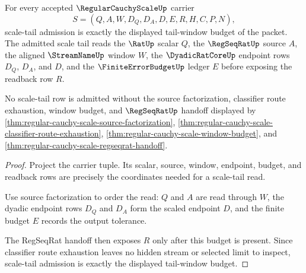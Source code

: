 \begin{theorem}
\label{thm:regular-cauchy-scale-tail-window-carrier-obligation}
For every accepted $\RegularCauchyScaleUp$ carrier
$$
S=(Q,A,W,D_Q,D_A,D,E,R,H,C,P,N),
$$
scale-tail admission is exactly the displayed tail-window budget of the packet. The admitted scale tail reads the $\RatUp$ scalar $Q$, the $\RegSeqRatUp$ source $A$, the aligned $\StreamNameUp$ window $W$, the $\DyadicRatCoreUp$ endpoint rows $D_Q$, $D_A$, and $D$, and the $\FiniteErrorBudgetUp$ ledger $E$ before exposing the readback row $R$.

No scale-tail row is admitted without the source factorization, classifier route exhaustion, window budget, and $\RegSeqRatUp$ handoff displayed by \autoref{thm:regular-cauchy-scale-source-factorization}, \autoref{thm:regular-cauchy-scale-classifier-route-exhaustion}, \autoref{thm:regular-cauchy-scale-window-budget}, and \autoref{thm:regular-cauchy-scale-regseqrat-handoff}.
\end{theorem}
\begin{proof}
Project the carrier tuple. Its scalar, source, window, endpoint, budget, and readback rows are precisely the coordinates needed for a scale-tail read.

Use source factorization to order the read: $Q$ and $A$ are read through $W$, the dyadic endpoint rows $D_Q$ and $D_A$ form the scaled endpoint $D$, and the finite budget $E$ records the output tolerance.

The RegSeqRat handoff then exposes $R$ only after this budget is present. Since classifier route exhaustion leaves no hidden stream or selected limit to inspect, scale-tail admission is exactly the displayed tail-window budget.
\end{proof}


